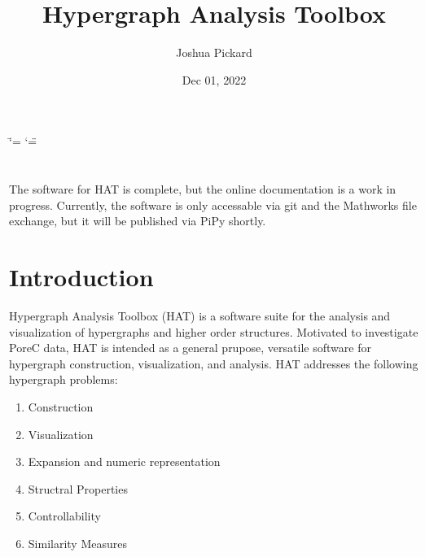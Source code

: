 \documentclass[letterpaper,10pt,english]{sphinxmanual}
\title{Hypergraph Analysis Toolbox}
\date{Dec 01, 2022}
\author{Joshua Pickard}
\begin{document}
\ifdefined\shorthandoff
  \ifnum\catcode`\=\string=\active\shorthandoff{=}\fi
  \ifnum\catcode`\"=\active{}\fi
\fi

\pagestyle{empty}
\sphinxmaketitle
\pagestyle{plain}
\sphinxtableofcontents
\pagestyle{normal}
\label{\detokenize{index::doc}}




\chapter{}
\label{\detokenize{index:important-note}}
\sphinxAtStartPar
The software for HAT is complete, but the online documentation is a work in progress. Currently, the software is only accessable via git and the Mathworks file exchange, but it will be published via PiPy shortly.


\chapter{Introduction}
\label{\detokenize{index:introduction}}
\sphinxAtStartPar
Hypergraph Analysis Toolbox (HAT) is a software suite for the analysis and visualization of hypergraphs and
higher order structures. Motivated to investigate Pore\sphinxhyphen{}C data, HAT is intended as a general prupose, versatile
software for hypergraph construction, visualization, and analysis. HAT addresses the following hypergraph
problems:
\begin{enumerate}
%
\item {} 
\sphinxAtStartPar
Construction

\item {} 
\sphinxAtStartPar
Visualization

\item {} 
\sphinxAtStartPar
Expansion and numeric representation

\item {} 
\sphinxAtStartPar
Structral Properties

\item {} 
\sphinxAtStartPar
Controllability

\item {} 
\sphinxAtStartPar
Similarity Measures

\end{enumerate}
\end{document}
